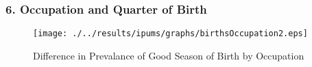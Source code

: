 \documentclass[10pt,letterpaper,subeqn]{beamer}
\begin{document}
\begin{frame}
\frametitle{6. Occupation and Quarter of Birth}
\begin{figure}[htpb!]
\begin{center}
  \centering
  \caption{Difference in Prevalance of Good Season of Birth by Occupation}
  \texttt{[image: ./../results/ipums/graphs/birthsOccupation2.eps]}
  \label{fig:goodByOcc2}
\end{center}
\end{figure}
\end{frame}
\end{document}
